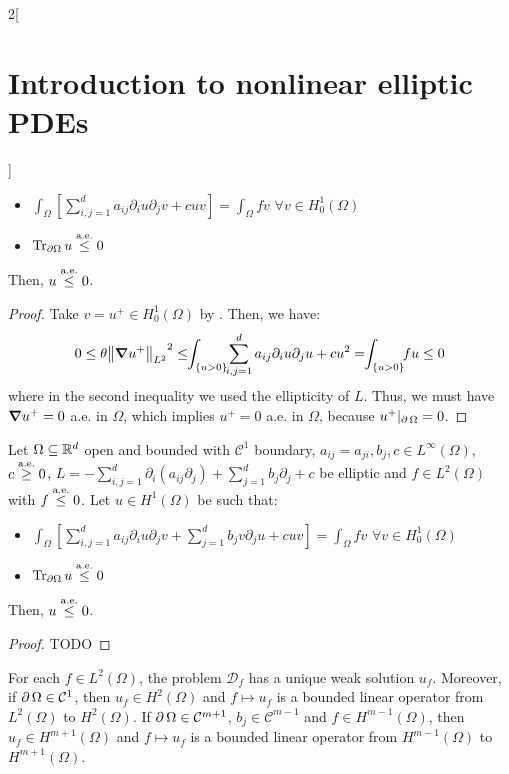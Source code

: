 \documentclass[../../../main_math.tex]{subfiles}
\begin{document}
\begin{multicols}{2}[\section{Introduction to nonlinear elliptic PDEs}]
\begin{theorem}
    \begin{itemize}
      \item $\displaystyle \int_\Omega\left[\sum_{i,j=1}^da_{ij}\partial_iu\partial_jv+cuv\right]=\int_\Omega fv$ $\forall v\in H^1_0(\Omega)$
      \item $\Tr_{\partial\Omega}u\overset{\text{a.e.}}{\leq}0$
    \end{itemize}
    Then, $u\overset{\text{a.e.}}{\leq}0$.
  \end{theorem}
  \begin{proof}
    Take $v=u^+\in H^1_0(\Omega)$ by . Then, we have:
    $$
      0\leq \theta {\norm{\grad u^+}_{L^2}}^2\leq\!\! \int_{\{u>0\}}\!\!\sum_{i,j=1}^d a_{ij}\partial_iu\partial_ju+cu^2=\!\!\int_{\{u>0\}} \!\!fu\leq 0
    $$
    where in the second inequality we used the ellipticity of $L$. Thus, we must have $\grad u^+=0$ a.e. in $\Omega$, which implies $u^+=0$ a.e. in $\Omega$, because $u^+|_{\operatorname{\partial}{\Omega}}=0$.
  \end{proof}
  \begin{theorem}
    Let $\Omega\subseteq\mathbb{R}^d$ open and bounded with $\mathcal{C}^1$ boundary, $a_{ij}=a_{ji},b_j,c\in L^\infty(\Omega)$, $c \overset{\text{a.e.}}{\geq}0$, $L=-\sum_{i,j=1}^d\partial_i(a_{ij}\partial_j)+\sum_{j=1}^db_j\partial_j+c$ be elliptic and $f\in L^2(\Omega)$ with $f\overset{\text{a.e.}}{\leq} 0$. Let $u\in H^1(\Omega)$ be such that:
    \begin{itemize}
      \item $\displaystyle \int_\Omega\left[\sum_{i,j=1}^da_{ij}\partial_iu\partial_jv+ \sum_{j=1}^db_jv\partial_ju+cuv\right]=\int_\Omega fv$ $\forall v\in H^1_0(\Omega)$
      \item $\Tr_{\partial\Omega}u\overset{\text{a.e.}}{\leq}0$
    \end{itemize}
    Then, $u\overset{\text{a.e.}}{\leq}0$.
  \end{theorem}
  \begin{proof}
    TODO
  \end{proof}
  \begin{corollary}
    For each $f\in L^2(\Omega)$, the problem $\mathcal{D}_f$ has a unique weak solution $u_f$. Moreover, if $\operatorname{\partial}{\Omega}\in\mathcal{C}^1$, then $u_f\in H^2(\Omega)$ and $f\mapsto u_f$ is a bounded linear operator from $L^2(\Omega)$ to $H^2(\Omega)$. If $\operatorname{\partial}{\Omega}\in\mathcal{C}^{m+1}$, $b_j\in\mathcal{C}^{m-1}$ and $f\in H^{m-1}(\Omega)$, then $u_f\in H^{m+1}(\Omega)$ and $f\mapsto u_f$ is a bounded linear operator from $H^{m-1}(\Omega)$ to $H^{m+1}(\Omega)$.
  \end{corollary}

\end{multicols}
\end{document}
